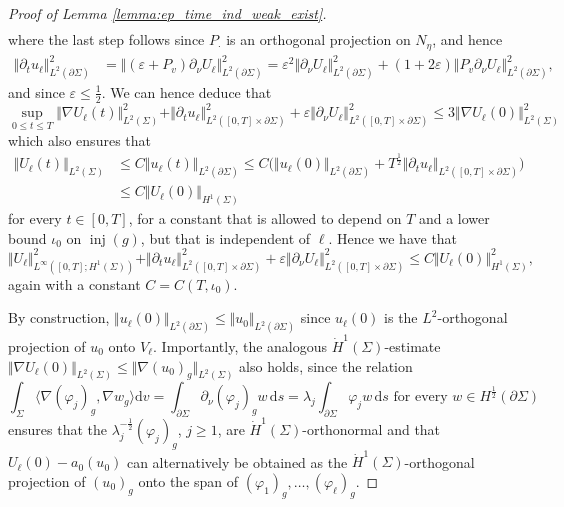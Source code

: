 \documentclass[10pt,a4paper]{amsart}
\newcommand{\Si}{\Sigma}
\newcommand{\beq}{\begin{equation}}
\newcommand{\beqs}{\begin{equation*}}
\newcommand{\dd}{\mathrm{d}} %
\newcommand{\eeq}{\end{equation}}
\newcommand{\eeqs}{\end{equation*}}
\newcommand{\ep}{\varepsilon}
\newcommand{\half}{\frac{1}{2}}
\newcommand{\hf}{\frac{1}{2}} %
\DeclareMathOperator{\inj}{inj}
\newcommand{\la}{\lambda} %
\newcommand{\na}{\nabla}
\newcommand{\norm}[1]{\Vert#1\Vert}
\newcommand{\p}{\partial} %
\newcommand{\pSi}{{\partial \Sigma}}
\newcommand{\vph}{\varphi}
\newcommand{\vphi}{\varphi}
\begin{document}
\begin{proof}[Proof of Lemma \ref{lemma:ep_time_ind_weak_exist}]
\begin{align}
    \end{align}
    where the last step follows since $ P_{\cdot}$ is an orthogonal projection on $N_\eta$, and hence 
    \begin{align*}
        \norm{\p_t u_\ell}_{L^2(\p\Si)}^2&=\norm{(\ep + P_{v})\p_{\nu}U_\ell}_{L^2(\p\Si)}^2
        = \ep^2\norm{\p_{\nu} U_\ell}_{L^2(\p\Si)}^2 + (1 + 2\ep)\norm{P_{v}\p_{\nu}U_\ell}_{L^2(\p\Si)}^2,
    \end{align*} 
    and since $\ep\le \hf$. We can hence deduce that 
    \begin{equation}\label{est:galerkin_uniform}
        \sup_{0\le t\le T}\norm{\nabla U_\ell(t)}_{L^2(\Si)}^2 + \norm{\p_t u_\ell}_{L^2([0,T]\times\p\Si)}^2 + \ep\norm{\p_{\nu}U_\ell}_{L^2([0,T]\times\p\Si)}^2\leq 3\norm{\nabla U_\ell(0)}_{L^2(\Si)}^2
    \end{equation} 
    which also ensures that
    \begin{equation*}
        \begin{split}
            \norm{U_\ell(t)}_{L^2(\Si)} &\le C\norm{u_\ell(t)}_{L^2(\p\Si)} \le C\big(\norm{u_\ell(0)}_{L^2(\p\Si)} + T^{\half}\norm{\p_t u_\ell}_{L^2([0,T]\times\p\Si)}\big)\\
            &\le C\norm{U_\ell(0)}_{H^1(\Si)}
        \end{split}
    \end{equation*}
    for every $t\in [0,T]$, for a constant that is allowed to depend on $T$ and a lower bound $\iota_0$ on $\inj(g)$, but that is independent of $\ell$. 
    Hence we have that
    \beq\label{est:H1-Galerkin}
        \norm{ U_\ell}_{L^\infty([0,T];H^1(\Si))}^2+\norm{\p_t u_\ell}_{L^2([0,T]\times \p\Si)}^2 + \ep\norm{\p_{\nu} U_\ell}_{L^2([0,T]\times\p\Si)}^2\le C\norm{U_\ell(0)}_{H^1(\Si)}^2,
    \eeq
    again with a constant $C=C(T,\iota_0)$.  
    
    By construction, $\norm{u_\ell(0)}_{L^2(\p\Si)}\leq\norm{u_0}_{L^2(\p\Si)}$ since $u_\ell(0)$ is the $L^2$-orthogonal projection of $u_0$ onto $V_\ell$. Importantly, the analogous $\dot H^1(\Si)$-estimate $\norm{\nabla U_\ell(0)}_{L^2(\Si)}\leq \norm{\na (u_0)_g}_{L^2(\Si)}$ also holds, since the relation 
    \beqs
        \int_\Si\langle\nabla (\vph_j)_g,\nabla w_g\rangle\dd v = \int_{\p\Si}\p_{\nu}(\vph_j)_g w\,\dd s = \lambda_j\int_{\p\Si}\vph_j w \, \dd s \text{ for every } w\in H^\half(\pSi)
    \eeqs
    ensures that the $\la_j^{-\hf} (\vph_j)_g$, $j \geq 1$, are $\dot H^1(\Si)$-orthonormal and that $U_\ell(0)-a_0(u_0)$ can alternatively be obtained as the $\dot H^1(\Si)$-orthogonal projection of $(u_0)_g$ onto the span of $(\vphi_1)_g,\dots,(\vphi_\ell)_g$.
 

\end{proof}
\end{document}
